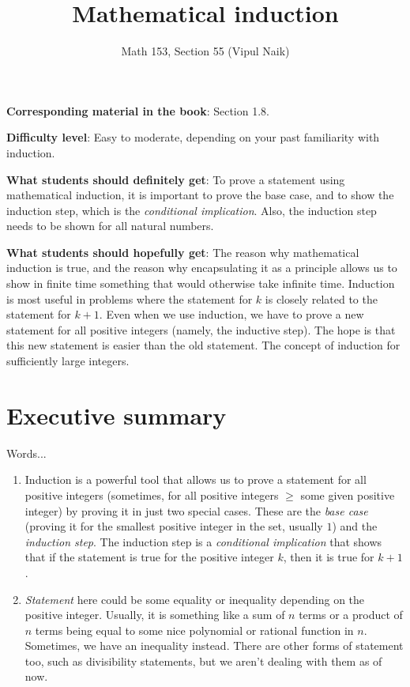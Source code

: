 \documentclass{amsart}
\title{Mathematical induction}
\author{Math 153, Section 55 (Vipul Naik)}
\begin{document}
\maketitle

{\bf Corresponding material in the book}: Section 1.8.

{\bf Difficulty level}: Easy to moderate, depending on your past
familiarity with induction.

{\bf What students should definitely get}: To prove a statement using
mathematical induction, it is important to prove the base case, and to
show the induction step, which is the {\em conditional
implication}. Also, the induction step needs to be shown for all
natural numbers.

{\bf What students should hopefully get}: The reason why mathematical
induction is true, and the reason why encapsulating it as a principle
allows us to show in finite time something that would otherwise take
infinite time. Induction is most useful in problems where the
statement for $k$ is closely related to the statement for $k +
1$. Even when we use induction, we have to prove a new statement for
all positive integers (namely, the inductive step). The hope is that
this new statement is easier than the old statement. The concept of
induction for sufficiently large integers.

\section*{Executive summary}

Words...

\begin{enumerate}
\item Induction is a powerful tool that allows us to prove a statement
  for all positive integers (sometimes, for all positive integers
  $\ge$ some given positive integer) by proving it in just two special
  cases. These are the {\em base case} (proving it for the smallest
  positive integer in the set, usually $1$) and the {\em induction
  step}. The induction step is a {\em conditional implication} that
  shows that if the statement is true for the positive integer $k$,
  then it is true for $k + 1$.
\item {\em Statement} here could be some equality or inequality
  depending on the positive integer. Usually, it is something like a
  sum of $n$ terms or a product of $n$ terms being equal to some nice
  polynomial or rational function in $n$. Sometimes, we have an
  inequality instead. There are other forms of statement too, such as
  divisibility statements, but we aren't dealing with them as of now.
\end{enumerate}
\end{document}
